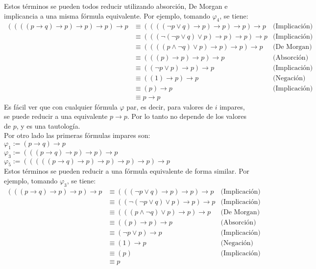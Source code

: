 \documentclass[letter]{article}
\begin{document}
\begin{pregunta}{1}
\begin{enumerate}
			Estos términos se pueden todos reducir utilizando absorción, De Morgan e implicancia a una misma fórmula equivalente. Por ejemplo, tomando $\varphi_4$, se tiene:
			\begin{align*}
				((((p \rightarrow q)\rightarrow p)\rightarrow p)\rightarrow p)\rightarrow p
				&\equiv ((((\neg p \vee q)\rightarrow p)\rightarrow p)\rightarrow p)\rightarrow p &\text{(Implicación)} \\
				&\equiv (((\neg(\neg p \vee q)\vee p)\rightarrow p)\rightarrow p)\rightarrow p &\text{(Implicación)} \\
				&\equiv ((((p \wedge \neg q)\vee p)\rightarrow p)\rightarrow p)\rightarrow p &\text{(De Morgan)} \\
				&\equiv (((p) \rightarrow p)\rightarrow p)\rightarrow p &\text{(Absorción)} \\
				&\equiv ((\neg p \vee p)\rightarrow p)\rightarrow p &\text{(Implicación)} \\
				&\equiv ((1)\rightarrow p)\rightarrow p &\text{(Negación)} \\
				&\equiv (p)\rightarrow p &\text{(Implicación)} \\
				&\equiv p \rightarrow p
			\end{align*}
			Es fácil ver que con cualquier fórmula $\varphi$ par, es decir, para valores de $i$ impares, se puede reducir a una equivalente $p \rightarrow p$. Por lo tanto no depende de los valores de $p$, y es una tautología.\\
			
			Por otro lado las primeras fórmulas impares son:\\
		
			$\varphi_1:=(p \rightarrow q)\rightarrow p$\\
			$\varphi_3:=(((p \rightarrow q)\rightarrow p)\rightarrow p)\rightarrow p$\\
			$\varphi_5:=(((((p \rightarrow q)\rightarrow p)\rightarrow p)\rightarrow p)\rightarrow p)\rightarrow p$\\
			
			Estos términos se pueden reducir a una fórmula equivalente de forma similar. Por ejemplo, tomando $\varphi_3$, se tiene:
			\begin{align*}
				(((p \rightarrow q)\rightarrow p)\rightarrow p)\rightarrow p
				&\equiv (((\neg p \vee q)\rightarrow p)\rightarrow p)\rightarrow p &\text{(Implicación)} \\
				&\equiv ((\neg(\neg p \vee q)\vee p)\rightarrow p)\rightarrow p &\text{(Implicación)} \\
				&\equiv (((p \wedge \neg q)\vee p)\rightarrow p)\rightarrow p &\text{(De Morgan)} \\
				&\equiv ((p) \rightarrow p)\rightarrow p &\text{(Absorción)} \\
				&\equiv (\neg p \vee p)\rightarrow p &\text{(Implicación)} \\
				&\equiv (1)\rightarrow p &\text{(Negación)} \\
				&\equiv (p) &\text{(Implicación)} \\
				&\equiv p
			\end{align*}
			

\end{enumerate}
\end{pregunta}
\end{document}
